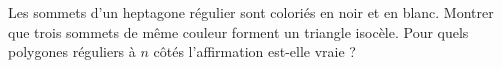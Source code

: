 Les sommets d'un heptagone régulier sont coloriés en noir et en blanc. Montrer que trois sommets de même couleur forment un triangle isocèle. Pour quels polygones réguliers à $n$ côtés l'affirmation est-elle vraie ?
